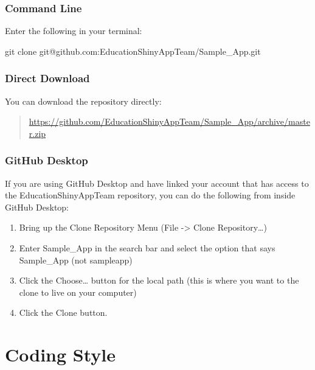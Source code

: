 \documentclass[]{book}
\newenvironment{Shaded}{\begin{snugshade}}{\end{snugshade}}
\newcommand{\FunctionTok}[1]{\textcolor[rgb]{0.00,0.00,0.00}{#1}}
\newcommand{\NormalTok}[1]{#1}
\providecommand{\tightlist}{%
  \setlength{\itemsep}{0pt}\setlength{\parskip}{0pt}}
\begin{document}
\hypertarget{command-line}{%
\subsection{Command Line}\label{command-line}}

Enter the following in your terminal:

\begin{Shaded}
\begin{Highlighting}[]
\FunctionTok{git}\NormalTok{ clone git@github.com:EducationShinyAppTeam/Sample_App.git}
\end{Highlighting}
\end{Shaded}

\hypertarget{direct-download}{%
\subsection{Direct Download}\label{direct-download}}

You can download the repository directly:

\begin{quote}
\url{https://github.com/EducationShinyAppTeam/Sample_App/archive/master.zip}
\end{quote}

\hypertarget{github-desktop}{%
\subsection{GitHub Desktop}\label{github-desktop}}

If you are using GitHub Desktop and have linked your account that has access to the EducationShinyAppTeam repository, you can do the following from inside GitHub Desktop:

\begin{enumerate}
\def\labelenumi{\arabic{enumi}.}
\tightlist
\item
  Bring up the Clone Repository Menu (File -\textgreater{} Clone Repository\ldots{})\\
\item
  Enter Sample\_App in the search bar and select the option that says Sample\_App (not sampleapp)
\item
  Click the Choose\ldots{} button for the local path (this is where you want to the clone to live on your computer)
\item
  Click the Clone button.
\end{enumerate}

\hypertarget{coding}{%
\chapter{Coding Style}\label{coding}}
\end{document}
